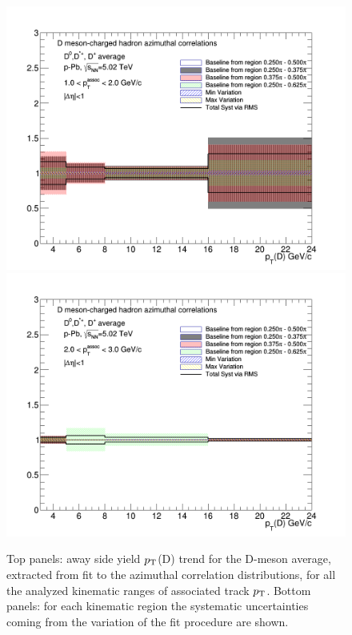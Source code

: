 \begin{figure}[!htbp]
{\includegraphics[width=0.49\linewidth, height=0.33\linewidth]{figures/FitOutput/BaselineSystematicSourcesASYield_pthad1dotto2dot.png}}
{\includegraphics[width=0.49\linewidth, height=0.33\linewidth]{figures/FitOutput/BaselineSystematicSourcesASYield_pthad2dotto3dot.png}}
\caption{Top panels: away side yield $p_{\rm T}$(D) trend for the D-meson average, extracted from fit to the azimuthal correlation distributions, for all the analyzed kinematic ranges of associated track $p_{\rm T}$. Bottom panels: for each kinematic region the systematic uncertainties coming from the variation of the fit procedure are shown.}
\label{fig:awaysideyieldAverage}
\end{figure}

